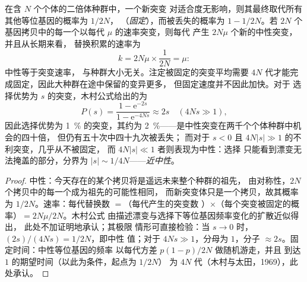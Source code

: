 \begin{theorem}[中性替换速率]\label{thm:b3:molecular-evolution:neutral}
在含 $N$ 个个体的二倍体种群中，一个新突变
对适合度无影响，则其最终取代所有其他等位基因的概率为 $1/2N$，
（\emph{固定}），而被丢失的概率为 $1 - 1/2N$。若
$2N$ 个基因拷贝中的每一个以每代 $\mu$ 的速率突变，则每代
产生 $2N\mu$ 个新的中性突变，并且从长期来看，
替换积累的速率为
\[
k = 2N\mu\times\frac{1}{2N} = \mu :
\]
中性\emph{}等于突变速率，
与种群大小无关。注定被固定的突变平均需要
$4N$ 代才能完成固定，因此大种群在途中保留的变异更多，
但固定速度并不因此加快。对于
选择优势为 $s$ 的突变，木村公式给出的为
\[
P(s) = \frac{1 - \mathrm{e}^{-2s}}{1 - \mathrm{e}^{-4Ns}} \approx 2s
\quad (4Ns \gg 1),
\]
因此选择优势为 \qty{1}{\%} 的突变，其约为
\qty{2}{\%}——是中性突变在两千个个体种群中机会的四十倍，
但仍有五十次中四十九次被丢失；
而对于 $s < 0$ 且 $4N|s| \gg 1$ 的不利突变，几乎从不被固定，
而 $4N|s| \ll 1$ 者则表现为中性：选择
只能看到漂变无法掩盖的部分，分界为 $|s| \sim
1/4N$——\emph{近中性}。
\end{theorem}
\begin{proof}
中性：今天存在的某个拷贝将是遥远未来整个种群的祖先，
由对称性，$2N$ 个拷贝中的每一个成为祖先的可能性相同，
而新突变体只是一个拷贝，故其概率为
$1/2N$。速率：每代替换数 $=$（每代产生的突变数
）$\times$（每个突变被固定的概率）$= 2N\mu/2N$。木村公式
由描述漂变与选择下等位基因频率变化的扩散近似得出，
此处不加证明地承认；其极限
情形可直接检验：当 $s \to 0$ 时，$(2s)/(4Ns) = 1/2N$，即中性
值；对于 $4Ns \gg 1$，分母为 $1$，分子
$\approx 2s$。固定时间：中性等位基因的频率
以每代方差 $p(1-p)/2N$ 做随机游走，并且
到达 $1$ 的期望时间（以此为条件，起点为 $1/2N$）
为 $4N$ 代（木村与太田，1969），此处承认。
\end{proof}

